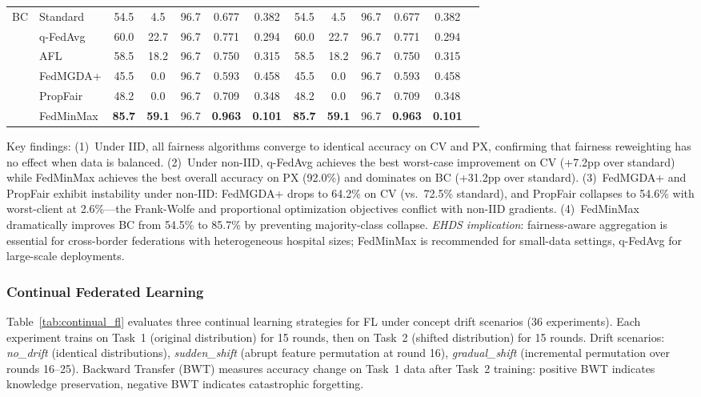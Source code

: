 \documentclass[conference]{IEEEtran}
\begin{document}
\begin{table}[htbp]
{\begin{tabular}{llccccccccccc}
\midrule
\multirow{6}{*}{BC} & Standard & 54.5 & 4.5 & 96.7 & 0.677 & 0.382 & 54.5 & 4.5 & 96.7 & 0.677 & 0.382 \\
 & q-FedAvg & 60.0 & 22.7 & 96.7 & 0.771 & 0.294 & 60.0 & 22.7 & 96.7 & 0.771 & 0.294 \\
 & AFL & 58.5 & 18.2 & 96.7 & 0.750 & 0.315 & 58.5 & 18.2 & 96.7 & 0.750 & 0.315 \\
 & FedMGDA+ & 45.5 & 0.0 & 96.7 & 0.593 & 0.458 & 45.5 & 0.0 & 96.7 & 0.593 & 0.458 \\
 & PropFair & 48.2 & 0.0 & 96.7 & 0.709 & 0.348 & 48.2 & 0.0 & 96.7 & 0.709 & 0.348 \\
 & FedMinMax & \textbf{85.7} & \textbf{59.1} & 96.7 & \textbf{0.963} & \textbf{0.101} & \textbf{85.7} & \textbf{59.1} & 96.7 & \textbf{0.963} & \textbf{0.101} \\
\bottomrule
\end{tabular}%
}

\vspace{1mm}
\footnotesize{Key findings: (1)~Under IID, all fairness algorithms converge to identical accuracy on CV and PX, confirming that fairness reweighting has no effect when data is balanced. (2)~Under non-IID, q-FedAvg achieves the best worst-case improvement on CV (+7.2pp over standard) while FedMinMax achieves the best overall accuracy on PX (92.0\%) and dominates on BC (+31.2pp over standard). (3)~FedMGDA+ and PropFair exhibit instability under non-IID: FedMGDA+ drops to 64.2\% on CV (vs.\ 72.5\% standard), and PropFair collapses to 54.6\% with worst-client at 2.6\%---the Frank-Wolfe and proportional optimization objectives conflict with non-IID gradients. (4)~FedMinMax dramatically improves BC from 54.5\% to 85.7\% by preventing majority-class collapse. \textit{EHDS implication}: fairness-aware aggregation is essential for cross-border federations with heterogeneous hospital sizes; FedMinMax is recommended for small-data settings, q-FedAvg for large-scale deployments.}
\end{table}

\subsubsection{Continual Federated Learning}
\label{sec:continual_exp}

Table~\ref{tab:continual_fl} evaluates three continual learning strategies for FL under concept drift scenarios (36 experiments). Each experiment trains on Task~1 (original distribution) for 15 rounds, then on Task~2 (shifted distribution) for 15 rounds. Drift scenarios: \textit{no\_drift} (identical distributions), \textit{sudden\_shift} (abrupt feature permutation at round 16), \textit{gradual\_shift} (incremental permutation over rounds 16--25). Backward Transfer (BWT) measures accuracy change on Task~1 data after Task~2 training: positive BWT indicates knowledge preservation, negative BWT indicates catastrophic forgetting.
\end{document}

